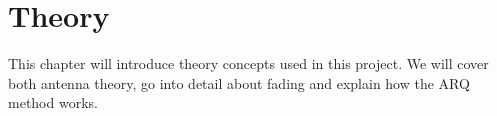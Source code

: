 \chapter{Theory}\label{ch:theory}

This chapter will introduce theory concepts used in this project. We will cover both antenna theory, go into detail about fading and explain how the ARQ method works.

